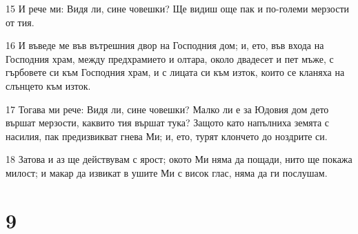 \par 15 И рече ми: Видя ли, сине човешки? Ще видиш още пак и по-големи мерзости от тия.
\par 16 И въведе ме във вътрешния двор на Господния дом; и, ето, във входа на Господния храм, между предхрамието и олтара, около двадесет и пет мъже, с гърбовете си към Господния храм, и с лицата си към изток, които се кланяха на слънцето към изток.
\par 17 Тогава ми рече: Видя ли, сине човешки? Малко ли е за Юдовия дом дето вършат мерзости, каквито тия вършат тука? Защото като напълниха земята с насилия, пак предизвикват гнева Ми; и, ето, турят клончето до ноздрите си.
\par 18 Затова и аз ще действувам с ярост; окото Ми няма да пощади, нито ще покажа милост; и макар да извикат в ушите Ми с висок глас, няма да ги послушам.

\chapter{9}

